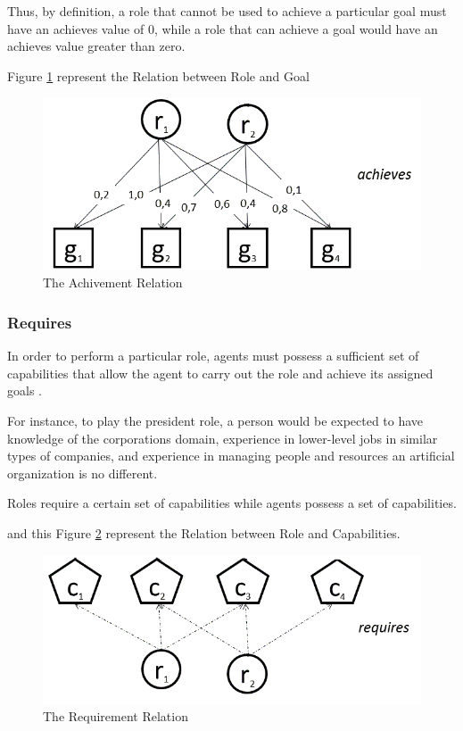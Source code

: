 Thus, by definition, a role that cannot be used to achieve a particular goal must have an achieves value of 0, while a role that can achieve a goal would have an achieves value greater than zero\cite{omacs4}.

Figure \ref{fig:The Achivement Relation} represent the Relation between Role and Goal 
\begin{figure}[th]
	\centering
		\includegraphics[scale=0.5]{ch1/img/RelAchieve}
	\caption{\label{fig:The Achivement Relation}The Achivement Relation}
\end{figure} 
 

\subsubsection{Requires}

In order to perform a particular role, agents must possess a sufficient set of capabilities that allow
the agent to carry out the role and achieve its assigned goals \cite{omacs2}.

For instance, to play the president role,
 a person would be expected to have knowledge of the corporations domain, experience in
lower-level jobs in similar types of companies, and experience in managing people and resources 
an artificial organization is no different. 

Roles require a certain set of capabilities while agents
possess a set of capabilities\cite{omacs2}.


and this Figure \ref{fig:The Requirment Relation} represent the Relation between Role and Capabilities.

\begin{figure}[th]
	\centering
		\includegraphics[scale=0.5]{ch1/img/RelRequire}
	\caption{\label{fig:The Requirment Relation}The Requirement Relation}
\end{figure}

